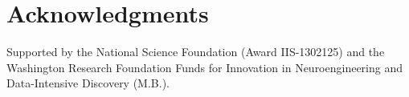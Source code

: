 \section*{Acknowledgments}

Supported by the National Science Foundation (Award IIS-1302125) and the Washington Research Foundation Funds for Innovation in Neuroengineering and Data-Intensive Discovery (M.B.).